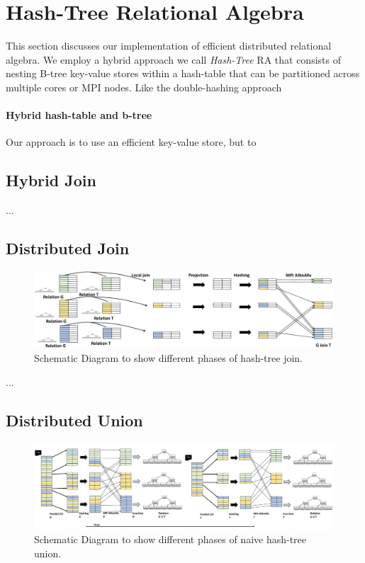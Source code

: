 

\section{Hash-Tree Relational Algebra}
\label{sec:impl}
%
This section discusses our implementation of efficient distributed relational algebra. We employ a hybrid approach we call \emph{Hash-Tree} RA that consists of nesting B-tree key-value stores within a hash-table that can be partitioned across multiple cores or MPI nodes. Like the double-hashing approach 



\paragraph{Hybrid hash-table and b-tree} Our approach is to use an efficient key-value store, but to



\subsection{Hybrid Join}

...

\subsection{Distributed Join}
\begin{figure}[h]
	\includegraphics[width=\textwidth]{results/join_new.pdf}
	\caption{Schematic Diagram to show different phases of hash-tree join.}
	\label{fig:join}
\end{figure}
...


\subsection{Distributed Union}
\begin{figure}[h]
	\includegraphics[width=\textwidth]{results/union_1.pdf}
	\caption{Schematic Diagram to show different phases of naive hash-tree union.}
	\label{fig:union_1}
\end{figure}



